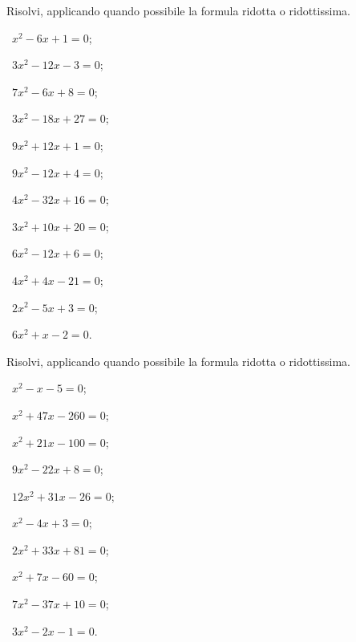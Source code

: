 \begin{esercizio}[\Ast]
\label{ese:3.15}
Risolvi, applicando quando possibile la formula ridotta o ridottissima.
\begin{multicols}{2}
 \begin{enumeratea}
 \item~$x^{2}-6 x + 1 = 0$;
 \item~$3 x^{2}-12 x-3 = 0$;
 \item~$7 x^{2}-6 x + 8 = 0$;
 \item~$3 x^{2}-18 x + 27 = 0$;
 \item~$9 x^{2} + 12 x + 1 = 0$;
 \item~$9 x^{2}-12 x + 4 = 0$;
 \item~$4 x^{2}-32 x + 16 = 0$;
 \item~$3 x^{2} + 10 x + 20 = 0$;
 \item~$6 x^{2} - 12 x + 6 = 0$;
 \item~$4 x^{2} + 4 x - 21 = 0$;
 \item~$2 x^{2} -5 x + 3 = 0$;
 \item~$6 x^{2} + x - 2 = 0$.
 \end{enumeratea}
 \end{multicols}
\end{esercizio}

\begin{esercizio}[\Ast]
\label{ese:3.16} %
Risolvi, applicando quando possibile la formula ridotta o ridottissima.
\begin{multicols}{2}
 \begin{enumeratea}
 \item~$x^{2}- x -5 = 0$;
 \item~$x^{2}+ 47 x-260 = 0$;
 \item~$x^{2}+21 x -100 = 0$;
 \item~$9 x^{2}-22 x + 8 = 0$;
 \item~$12 x^{2} + 31 x -26 = 0$;
 \item~$x^{2}-4 x + 3 = 0$;
 \item~$2 x^{2}+33 x + 81 = 0$;
 \item~$x^{2} + 7 x - 60 = 0$;
 \item~$7 x^{2} - 37 x + 10 = 0$;
 \item~$3 x^{2} -2 x -1 = 0$.
 \end{enumeratea}
 \end{multicols}
\end{esercizio}

